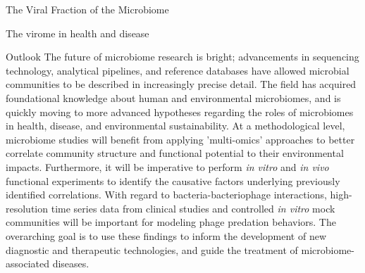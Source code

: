 \documentclass[oneside,12pt,final]{sty/ucthesis-CA2012}
\begin{document}
\begin{mainmatter}
\begin{section}{The Viral Fraction of the Microbiome}
\begin{subsection}{The virome in health and disease}
\end{subsection}
\end{section}


\begin{section}{Outlook}
The future of microbiome research is bright; advancements in sequencing technology, analytical pipelines, and reference databases have allowed microbial communities to be described in increasingly precise detail. The field has acquired foundational knowledge about human and environmental microbiomes, and is quickly moving to more advanced hypotheses regarding the roles of microbiomes in health, disease, and environmental sustainability. At a methodological level, microbiome studies will benefit from applying 'multi-omics' approaches to better correlate community structure and functional potential to their environmental impacts. Furthermore, it will be imperative to perform \textit{in vitro} and \textit{in vivo} functional experiments to identify the causative factors underlying previously identified correlations. With regard to bacteria-bacteriophage interactions, high-resolution time series data from clinical studies and controlled \textit{in vitro} mock communities will be important for modeling phage predation behaviors. The overarching goal is to use these findings to inform the development of new diagnostic and therapeutic technologies, and guide the treatment of microbiome-associated diseases. 
\end{section}



\end{mainmatter}
\end{document}
